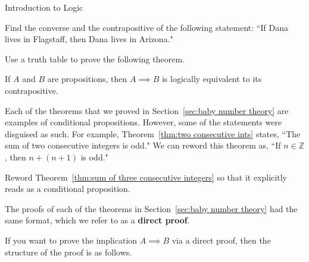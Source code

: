 \begin{section}{Introduction to Logic}
\begin{problem}
Find the converse and the contrapositive of the following statement: ``If Dana lives in Flagstaff, then Dana lives in Arizona."
\end{problem}

Use a truth table to prove the following theorem.

\begin{theorem}\label{thm:contrapos}
If $A$ and $B$ are propositions, then ${A\implies B}$ is logically equivalent to its contrapositive.
\end{theorem}

Each of the theorems that we proved in Section~\ref{sec:baby number theory} are examples of conditional propositions. However, some of the statements were disguised as such. For example, Theorem~\ref{thm:two consecutive ints} states, ``The sum of two consecutive integers is odd." We can reword this theorem as, ``If $n\in\mathbb{Z}$, then $n+(n+1)$ is odd."

\begin{problem}\label{prob:reword as conditional}
Reword Theorem~\ref{thm:sum of three consecutive integers} so that it explicitly reads as a conditional proposition.
\end{problem}

The proofs of each of the theorems in Section~\ref{sec:baby number theory} had the same format, which we refer to as a \textbf{direct proof}. 

\begin{skeleton}\label{skeleton:direct proof}

If you want to prove the implication $A\implies B$ via a direct proof, then the structure of the proof is as follows.

\begin{center}
\end{center}
\end{skeleton}


\end{section}
